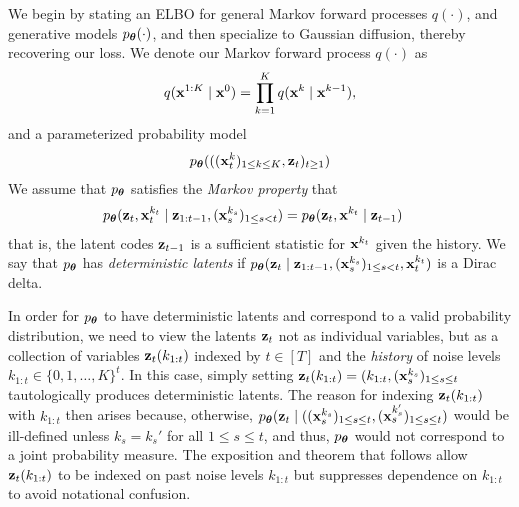 We begin by stating an ELBO for general Markov forward processes $q(\cdot)$, and generative models $p_{\bm{\theta}}(\cdot)$, and then specialize to Gaussian diffusion, thereby recovering our loss.  We denote our Markov forward process $q(\cdot)$ as 
\begin{align}
q(\mathbf{x}^{1:K} \mid \mathbf{x}^0) = \prod_{k=1}^K q(\mathbf{x}^k \mid \mathbf{x}^{k-1}), \label{eq:qforward}
\end{align}
and a parameterized probability model 
\begin{align}
p_{\bm{\theta}}(((\mathbf{x}^{k}_t)_{1 \le k \le K},\mathbf{z}_t)_{t \ge 1})
\end{align}
We assume that $p_{\bm{\theta}}$ satisfies the \emph{Markov property} that 
\begin{align}
&p_{\bm{\theta}}(\mathbf{z}_t, \mathbf{x}_t^{k_t}\mid \mathbf{z}_{1:t-1},(\mathbf{x}_{s}^{k_s})_{1 \le s < t}) = p_{\bm{\theta}}(\mathbf{z}_t, \mathbf{x}^{k_t}\mid \mathbf{z}_{t-1})
\end{align} 
that is, the latent codes $\mathbf{z}_{t-1}$ is a sufficient statistic for $\mathbf{x}^{k_t}$ given the history. We say that $p_{\bm{\theta}}$ has \emph{deterministic latents} if $p_{\bm{\theta}}(\mathbf{z}_t\mid \mathbf{z}_{1:t-1},(\mathbf{x}_{s}^{k_s})_{1 \le s < t},\mathbf{x}_t^{k_t})$ is a Dirac delta. 
\begin{remark} In order for $p_{\bm{\theta}}$ to have deterministic latents and correspond to a valid probability distribution, we need to view the latents $\mathbf{z}_t$ not as individual variables, but as a collection of variables $\mathbf{z}_t(k_{1:t})$  indexed by $t \in [T]$ and the \emph{history} of noise levels $k_{1:t} \in \{0,1,\dots,K\}^t$. In this case, simply setting $\mathbf{z}_t(k_{1:t}) = (k_{1:t},(\mathbf{x}_{s}^{k_s})_{1 \le s \le t}$ tautologically produces deterministic latents. The reason for indexing $\mathbf{z}_t(k_{1:t})$ with $k_{1:t}$ then arises because, otherwise, $p_{\bm{\theta}}(\mathbf{z}_t \mid ((\mathbf{x}_{s}^{k_s})_{1 \le s \le t},(\mathbf{x}_{s}^{k_s'})_{1 \le s \le t})$ would be ill-defined unless $k_s = k_s'$ for all $1 \le s \le t$, and thus, $p_{\bm{\theta}}$ would not correspond to a joint probability measure. The exposition and theorem that follows allow $\mathbf{z}_t(k_{1:t})$ to be indexed on past noise levels $k_{1:t}$ but suppresses dependence on $k_{1:t}$ to avoid notational confusion.
\end{remark}





